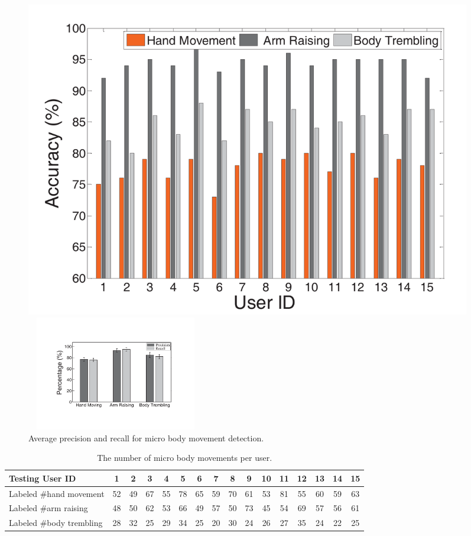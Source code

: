 \begin{figure}
	\centering
	\begin{minipage}{.485\textwidth}
		 \includegraphics[width=0.95\textwidth]{Figures/micro_movement_zhu.pdf}
		\caption{Micro body movement detection accuracy for each user.}\label{fig:micro_movement_zhu}	
	\end{minipage}%
\hspace{3pt}
	\begin{minipage}{.485\textwidth}
	 \centering
	\includegraphics[width=7.8cm,height=5cm]{Figures/micro_combine1.pdf}
	\caption{Average precision and recall for micro body movement detection.}\label{fig:micro_combine}
	\end{minipage}
\end{figure}


\begin{table}[!t]\footnotesize
  \caption{The number of micro body movements per user.}\label{tab:micro_move}
   \renewcommand\arraystretch{1}{\multirowsetup}{\centering}
        \begin{tabular}{lccccccccccccccc}
        \toprule
         \textbf{Testing User ID}    & 1& 2  & 3& 4& 5& 6& 7& 8& 9& 10& 11& 12& 13& 14& 15\\
        \midrule
            \rowcolor{Gray} {Labeled \#hand movement}  &52&49&67&55&78&65&59&70&61&53&81&55&60&59&63 \\
             { Labeled \#arm raising} &48&50&62&53&66&49&57&50&73&45&54&69&57&56&61\\
             \rowcolor{Gray} { Labeled \#body trembling} &28&32&25&29&34&25&20&30&24&26&27&35&24&22&25\\
        \bottomrule
 \end{tabular}
\end{table}


